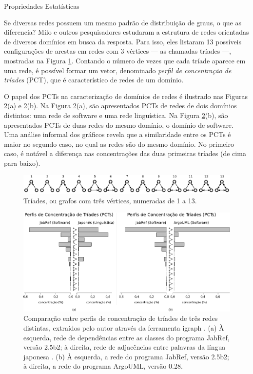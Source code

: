 \begin{section}{Propriedades Estatísticas}

Se diversas redes possuem um mesmo padrão de distribuição de graus, o que as diferencia? Milo e outros pesquisadores \cite{Milo2002} estudaram a estrutura de redes orientadas de diversos domínios em busca da resposta. Para isso, eles listaram 13 possíveis configurações de arestas em redes com 3 vértices --- as chamadas tríades ---, mostradas na Figura \ref{fig:triades}. Contando o número de vezes que cada tríade aparece em uma rede, é possível formar um vetor, denominado \emph{perfil de concentração de tríades} (PCT), que é característico de redes de um domínio. 

O papel dos PCTs na caracterização de domínios de redes é ilustrado nas Figuras \ref{fig:tcp}(a) e \ref{fig:tcp}(b). Na Figura \ref{fig:tcp}(a), são apresentados PCTs de redes de dois domínios distintos: uma rede de software e uma rede linguística. Na Figura \ref{fig:tcp}(b), são apresentados PCTs de duas redes do mesmo domínio, o domínio de software. Uma análise informal dos gráficos revela que a similaridade entre os PCTs é maior no segundo caso, no qual as redes são do mesmo domínio. No primeiro caso, é notável a diferença nas concentrações das duas primeiras tríades (de cima para baixo). 
% 

\begin{figure}[htbp]
	\centering
		\includegraphics[scale=1]{figuras/triads}
	\caption{Tríades, ou grafos com três vértices, numeradas de 1 a 13.}
	\label{fig:triades}
\end{figure}

\begin{figure}[htbp]
	\centering
		\includegraphics[width=1\textwidth]{figuras/tcp}
	\caption{Comparação entre perfis de concentração de tríades de três redes distintas, extraídos pelo autor através da ferramenta igraph \cite{igraph}. (a) À esquerda, rede de dependências entre as classes do programa JabRef, versão 2.5b2; à direita, rede de adjacências entre palavras da língua japonesa \cite{Milo2004}. (b) À esquerda, a rede do programa JabRef, versão 2.5b2; à direita, a rede do programa ArgoUML, versão 0.28.}
	\label{fig:tcp}
\end{figure}


\end{section}
